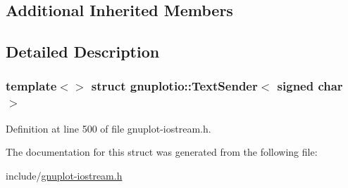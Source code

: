 \subsection*{Additional Inherited Members}


\subsection{Detailed Description}
\subsubsection*{template$<$$>$\newline
struct gnuplotio\+::\+Text\+Sender$<$ signed char $>$}



Definition at line 500 of file gnuplot-\/iostream.\+h.



The documentation for this struct was generated from the following file\+:\begin{DoxyCompactItemize}
\item 
include/\hyperlink{gnuplot-iostream_8h}{gnuplot-\/iostream.\+h}\end{DoxyCompactItemize}
